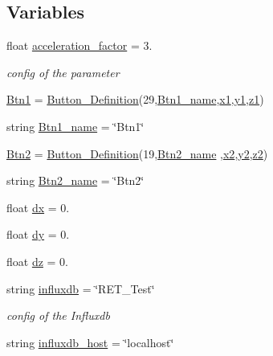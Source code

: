 \subsection*{Variables}
\begin{DoxyCompactItemize}
\item 
float \hyperlink{a00025_a425bc201cf7b10f0c4f1068f752e7c9b}{acceleration\+\_\+factor} = 3.
\begin{DoxyCompactList}\small\item\em config of the parameter \end{DoxyCompactList}\item 
\hyperlink{a00025_af037c6b9ff0314103d8127acc9d07e0b}{Btn1} = \hyperlink{a00053}{Button\+\_\+\+Definition}(29,\hyperlink{a00025_a96d98afcb35718dbc4c13c5bf74cfd5b}{Btn1\+\_\+name},\hyperlink{a00025_a3389d8b95846602e8f94cc15f41e48e9}{x1},\hyperlink{a00025_a9fe80bf4738047a31d7c162807ed85f0}{y1},\hyperlink{a00025_a7da4886c0a2e03b8bb9ed62eb20efb78}{z1})
\item 
string \hyperlink{a00025_a96d98afcb35718dbc4c13c5bf74cfd5b}{Btn1\+\_\+name} = \char`\"{}Btn1\char`\"{}
\item 
\hyperlink{a00025_a73afa8c52cebd94e1889df5fbe3bec66}{Btn2} = \hyperlink{a00053}{Button\+\_\+\+Definition}(19,\hyperlink{a00025_a9595d49d1fc79cce5a3f3af42cf8502a}{Btn2\+\_\+name} ,\hyperlink{a00025_a24d6ffb6e8780eef0c81cd97e3f4fdaf}{x2},\hyperlink{a00025_a07bcd014e69eddcf4243b2a961014eaf}{y2},\hyperlink{a00025_a55196b87940893e540ba636218f4eb07}{z2})
\item 
string \hyperlink{a00025_a9595d49d1fc79cce5a3f3af42cf8502a}{Btn2\+\_\+name} = \char`\"{}Btn2\char`\"{}
\item 
float \hyperlink{a00025_a9eae6c1f38db98ab568f3ed3771a969d}{dx} = 0.
\item 
float \hyperlink{a00025_a8f461b6142ce8725218813abb23b06a3}{dy} = 0.
\item 
float \hyperlink{a00025_a31755dd9c32708851ef90978cd814b35}{dz} = 0.
\item 
string \hyperlink{a00025_a6297da7d9cbabcbe91effb0271677ff3}{influxdb} = \char`\"{}R\+E\+T\+\_\+\+Test\char`\"{}
\begin{DoxyCompactList}\small\item\em config of the Influxdb \end{DoxyCompactList}\item 
string \hyperlink{a00025_a5ad590543d5ae7b0a89b3681d33928d8}{influxdb\+\_\+host} = \char`\"{}localhost\char`\"{}
\item 

\end{DoxyCompactItemize}
